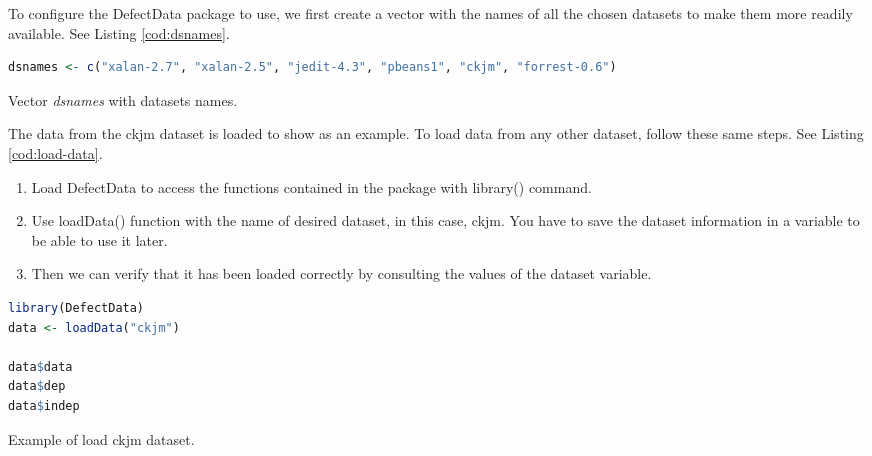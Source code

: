 To configure the DefectData package to use, we first create a vector with the names of all the chosen datasets to make them more readily available. See Listing \ref{cod:dsnames}.

\begin{codefloat}
\begin{lstlisting}[language=R, style=Ccolor]
dsnames <- c("xalan-2.7", "xalan-2.5", "jedit-4.3", "pbeans1", "ckjm", "forrest-0.6")
\end{lstlisting}
\caption{Vector \textit{dsnames} with datasets names.}
\label{cod:dsnames}
\end{codefloat}

The data from the ckjm dataset is loaded to show as an example. To load data from any other dataset, follow these same steps. See Listing \ref{cod:load-data}.
\begin{enumerate}
    \item Load DefectData to access the functions contained in the package with library() command.
    \item Use loadData() function with the name of desired dataset, in this case, ckjm. You have to save the dataset information in a variable to be able to use it later.
    \item Then we can verify that it has been loaded correctly by consulting the values of the dataset variable.
\end{enumerate}

\begin{codefloat}
\begin{lstlisting}[language=R, style=Ccolor]
library(DefectData)
data <- loadData("ckjm")

data$data
data$dep
data$indep
\end{lstlisting}
\caption{Example of load ckjm dataset.}
\label{cod:load-data}
\end{codefloat}

